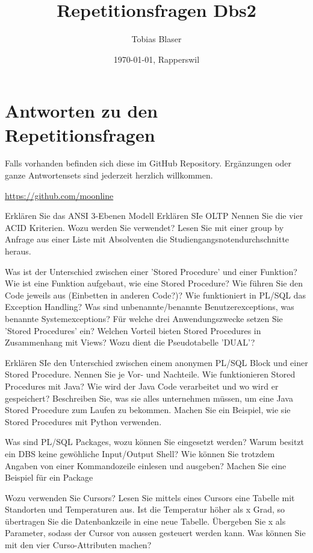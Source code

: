 \documentclass[ngerman,a4paper,12pt]{scrreprt}
\title{Repetitionsfragen Dbs2}
\author{Tobias Blaser}
\date{\today{}, Rapperswil}
\begin{document}
\tableofcontents

\vspace{1cm}
\section*{Antworten zu den Repetitionsfragen}
Falls vorhanden befinden sich diese im GitHub Repository. Ergänzungen oder ganze Antwortensets sind jederzeit herzlich willkommen.

\noindent\url{https://github.com/moonline}
\clearpage


\ol
	\li Erklären Sie das ANSI 3-Ebenen Modell
	\li Erklären SIe OLTP
	\li Nennen Sie die vier ACID Kriterien. Wozu werden Sie verwendet?
	\li Lesen Sie mit einer group by Anfrage aus einer Liste mit Absolventen die Studiengangsnotendurchschnitte heraus.
\olS


\olR
	\li Was ist der Unterschied zwischen einer 'Stored Procedure' und einer Funktion?
	\li Wie ist eine Funktion aufgebaut, wie eine Stored Procedure? Wie führen Sie den Code jeweils aus (Einbetten in anderen Code?)?
	\li Wie funktioniert in PL/SQL das Exception Handling? Was sind unbenannte/benannte Benutzerexceptions, was benannte Systemexceptions?
	\li Für welche drei Anwendungszwecke setzen Sie 'Stored Procedures' ein?
	\li Welchen Vorteil bieten Stored Procedures in Zusammenhang mit Views?
	\li Wozu dient die Pseudotabelle 'DUAL'?
\olS


\olR
	\li Erklären SIe den Unterschied zwischen einem anonymen PL/SQL Block und einer Stored Procedure. Nennen Sie je Vor- und Nachteile.
	\li Wie funktionieren Stored Procedures mit Java?
	\li Wie wird der Java Code verarbeitet und wo wird er gespeichert?
	\li Beschreiben Sie, was sie alles unternehmen müssen, um eine Java Stored Procedure zum Laufen zu bekommen.
	\li Machen Sie ein Beispiel, wie sie Stored Procedures mit Python verwenden.
\olS


\olR
	\li Was sind PL/SQL Packages, wozu können Sie eingesetzt werden?
	\li Warum besitzt ein DBS keine gewöhliche Input/Output Shell? Wie können Sie trotzdem Angaben von einer Kommandozeile einlesen und ausgeben?
	\li Machen Sie eine Beispiel für ein Package
\olS


\olR
	\li Wozu verwenden Sie Cursors?
	\li Lesen Sie mittels eines Cursors eine Tabelle mit Standorten und Temperaturen aus. Ist die Temperatur höher als x Grad, so übertragen Sie die Datenbankzeile in eine neue Tabelle.
	Übergeben Sie x als Parameter, sodass der Cursor von aussen gesteuert werden kann.
	\li Was können Sie mit den vier Curso-Attributen machen?
\olS
\end{document}

